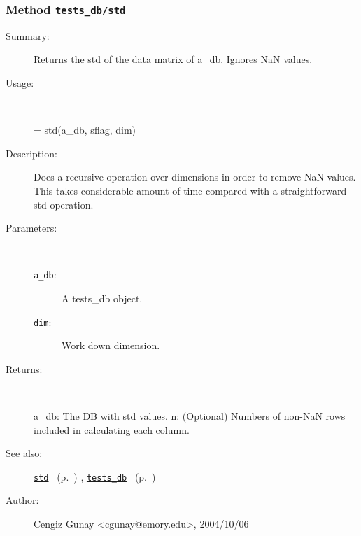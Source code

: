 \subsubsection[Method \texttt{std}]{Method \texttt{tests\_db/std}}%
%
\label{ref_tests_db__std}%
\hypertarget{ref_tests_db__std}{}%
\begin{description}
\item[Summary:]Returns the std of the data matrix of a\_db. Ignores NaN values.
%
\item[Usage:]~%
\begin{lyxcode}%
[a\_db, n] = std(a\_db, sflag, dim)
%
\end{lyxcode}%
%
\item[Description:]%
Does a recursive operation over dimensions in order to remove NaN values.
 This takes considerable amount of time compared with a straightforward std
 operation. 
\item[Parameters:]~
\begin{description}%
\item[\texttt{a\_db}:]
 A tests\_db object.
\item[\texttt{dim}:]
 Work down dimension.
\end{description}%
%
\item[Returns:]~

	a\_db: The DB with std values.
	n: (Optional) Numbers of non-NaN rows included in calculating each column.
%
%
\item[See also:]%
\hyperlink{ref_std}{\texttt{std}}%
\ (p.~\pageref{ref_std})%
%
, \hyperlink{ref_tests_db}{\texttt{tests\_db}}%
\ (p.~\pageref{ref_tests_db})%
%
%
\item[Author:]%
Cengiz Gunay <cgunay@emory.edu>, 2004/10/06%
\end{description}
\methodline%
